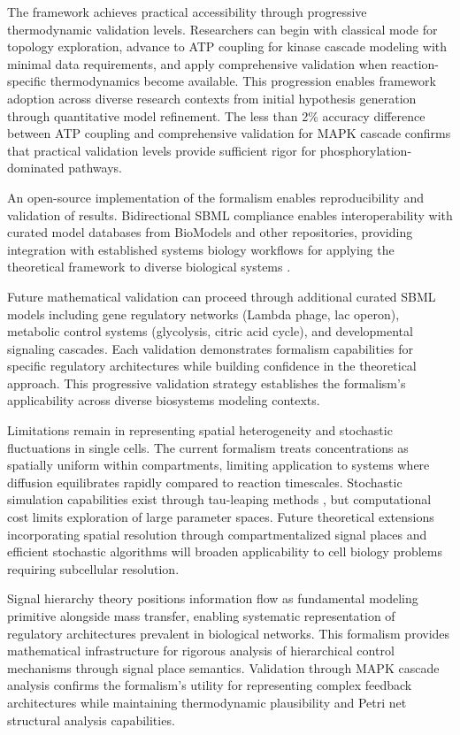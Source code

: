 \documentclass[twocolumn,11pt]{article}
\begin{document}
The framework achieves practical accessibility through progressive thermodynamic validation levels. Researchers can begin with classical mode for topology exploration, advance to ATP coupling for kinase cascade modeling with minimal data requirements, and apply comprehensive validation when reaction-specific thermodynamics become available. This progression enables framework adoption across diverse research contexts from initial hypothesis generation through quantitative model refinement. The less than 2\% accuracy difference between ATP coupling and comprehensive validation for MAPK cascade confirms that practical validation levels provide sufficient rigor for phosphorylation-dominated pathways.

An open-source implementation of the formalism enables reproducibility and validation of results. Bidirectional SBML compliance \citep{hucka2003} enables interoperability with curated model databases from BioModels and other repositories, providing integration with established systems biology workflows for applying the theoretical framework to diverse biological systems \citep{blinov2004}.

Future mathematical validation can proceed through additional curated SBML models including gene regulatory networks (Lambda phage, lac operon), metabolic control systems (glycolysis, citric acid cycle), and developmental signaling cascades. Each validation demonstrates formalism capabilities for specific regulatory architectures while building confidence in the theoretical approach. This progressive validation strategy establishes the formalism's applicability across diverse biosystems modeling contexts.

Limitations remain in representing spatial heterogeneity and stochastic fluctuations in single cells. The current formalism treats concentrations as spatially uniform within compartments, limiting application to systems where diffusion equilibrates rapidly compared to reaction timescales. Stochastic simulation capabilities exist through tau-leaping methods \citep{gillespie2001}, but computational cost limits exploration of large parameter spaces. Future theoretical extensions incorporating spatial resolution through compartmentalized signal places and efficient stochastic algorithms will broaden applicability to cell biology problems requiring subcellular resolution.

Signal hierarchy theory positions information flow as fundamental modeling primitive alongside mass transfer, enabling systematic representation of regulatory architectures prevalent in biological networks. This formalism provides mathematical infrastructure for rigorous analysis of hierarchical control mechanisms through signal place semantics. Validation through MAPK cascade analysis confirms the formalism's utility for representing complex feedback architectures while maintaining thermodynamic plausibility and Petri net structural analysis capabilities.
\end{document}
